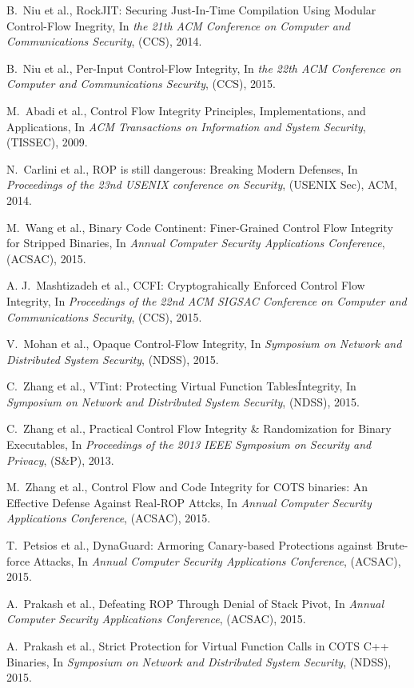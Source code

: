 \documentclass[11pt,a4paper,bibtotoc,idxtotoc,headsepline,footsepline,footexclude,BCOR12mm,DIV13]{scrbook}
\begin{document}
\begin{thebibliography}{30}
B.~Niu et al., {RockJIT: Securing Just-In-Time Compilation Using Modular Control-Flow Inegrity}, In
\emph{the 21th ACM Conference on Computer and Communications Security}, (CCS), 2014.

B.~Niu et al., {Per-Input Control-Flow Integrity}, In
\emph{the 22th ACM Conference on Computer and Communications Security}, (CCS), 2015.

M.~Abadi et al., {Control Flow Integrity Principles, Implementations, and Applications}, In
\emph{ACM Transactions on Information and System Security}, (TISSEC), 2009.

N.~Carlini et al., {ROP is still dangerous: Breaking Modern Defenses}, In
\emph{Proceedings of the 23nd USENIX conference on Security}, (USENIX Sec), ACM, 2014.

M.~Wang et al., {Binary Code Continent: Finer-Grained Control Flow Integrity for Stripped Binaries}, In
\emph{Annual Computer Security Applications Conference}, (ACSAC), 2015.




A. J.~Mashtizadeh et al., {CCFI: Cryptograhically Enforced Control Flow Integrity}, In
\emph{Proceedings of the 22nd ACM SIGSAC Conference on Computer and Communications Security}, (CCS), 2015.

V.~Mohan et al., {Opaque Control-Flow Integrity}, In
\emph{Symposium on Network and Distributed System Security}, (NDSS), 2015.

C.~Zhang et al., {VTint: Protecting Virtual Function Tables\' Integrity}, In
\emph{Symposium on Network and Distributed System Security}, (NDSS), 2015.

C.~Zhang et al., {Practical Control Flow Integrity \& Randomization for Binary Executables}, In
\emph{Proceedings of the 2013 IEEE Symposium on Security and Privacy}, (S\&P), 2013.

M.~Zhang et al., {Control Flow and Code Integrity for COTS binaries: An Effective Defense Against Real-ROP Attcks}, In
\emph{Annual Computer Security Applications Conference}, (ACSAC), 2015.

T.~Petsios et al., {DynaGuard: Armoring Canary-based Protections against Brute-force Attacks}, In
\emph{Annual Computer Security Applications Conference}, (ACSAC), 2015.

A.~Prakash et al., {Defeating ROP Through Denial of Stack Pivot}, In
\emph{Annual Computer Security Applications Conference}, (ACSAC), 2015.

A.~Prakash et al., {Strict Protection for Virtual Function Calls in COTS C++ Binaries}, In
\emph{Symposium on Network and Distributed System Security}, (NDSS), 2015.



\end{thebibliography}
	
 
\end{document}
